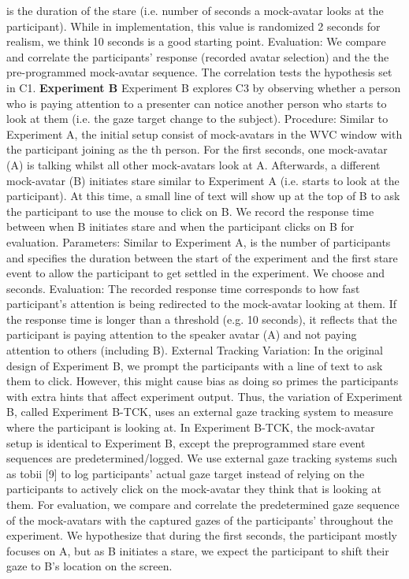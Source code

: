 \documentclass[sigconf,authordraft]{acmart}
\begin{document}
is the duration of the stare (i.e. number of seconds a mock-avatar looks at the participant). While in implementation, this value is randomized 2 seconds for realism, we think 10 seconds is a good starting point.
Evaluation: We compare and correlate the participants’ response (recorded avatar selection) and the the pre-programmed mock-avatar sequence. The correlation tests the hypothesis set in C1.
\newline
\textbf{Experiment B}
\newline
Experiment B explores C3 by observing whether a person who is paying attention to a presenter can notice another person who starts to look at them (i.e. the gaze target change to the subject).
Procedure: Similar to Experiment A, the initial setup consist of  mock-avatars in the WVC window with the participant joining as the th person. For the first  seconds, one mock-avatar (A) is talking whilst all other mock-avatars look at A. Afterwards, a different mock-avatar (B) initiates stare similar to Experiment A (i.e. starts to look at the participant).
At this time, a small line of text will show up at the top of B to ask the participant to use the mouse to click on B. We record the response time between when B initiates stare and when the participant clicks on B for evaluation. 
Parameters: Similar to Experiment A,  is the number of participants and  specifies the duration between the start of the experiment and the first stare event to allow the participant to get settled in the experiment. We choose  and  seconds.
Evaluation: The recorded response time corresponds to how fast participant’s attention is being redirected to the mock-avatar looking at them. If the response time is longer than a threshold (e.g. 10 seconds), it reflects that the participant is paying attention to the speaker avatar (A) and not paying attention to others (including B).
External Tracking Variation: In the original design of Experiment B, we prompt the participants with a line of text to ask them to click. However, this might cause bias as doing so primes the participants with extra hints that affect experiment output. Thus, the variation of Experiment B, called Experiment B-TCK, uses an external gaze tracking system to measure where the participant is looking at. 
In Experiment B-TCK, the mock-avatar setup is identical to Experiment B, except the preprogrammed stare event sequences are predetermined/logged. We use external gaze tracking systems such as tobii [9] to log participants’ actual gaze target instead of relying on the participants to actively click on the mock-avatar they think that is looking at them. For evaluation, we compare and correlate the predetermined gaze sequence of the mock-avatars with the captured gazes of the participants’ throughout the experiment. We hypothesize that during the first  seconds, the participant mostly focuses on A, but as B initiates a stare, we expect the participant to shift their gaze to B’s location on the screen.
\end{document}

